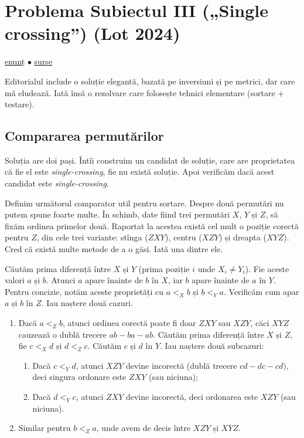 \documentclass[../main.tex]{subfiles}
\begin{document}
\section{Problema Subiectul III („Single crossing”) (Lot 2024)}
\label{problem:subiectul-iii}

\href{https://kilonova.ro/problems/2843}{enunț}
$\bullet$
\hyperref[code:subiectul-iii]{surse}

Editorialul include o soluție elegantă, bazată pe inversiuni și pe metrici, dar care mă eludează. Iată însă o rezolvare care folosește tehnici elementare (sortare + testare).

\subsection{Compararea permutărilor}

Soluția are doi pași. Întîi construim un candidat de soluție, care are proprietatea că fie el este \textit{single-crossing}, fie nu există soluție. Apoi verificăm dacă acest candidat este \textit{single-crossing}.

Definim următorul comparator util pentru sortare. Despre două permutări nu putem spune foarte multe. În schimb, date fiind trei permutări $X$, $Y$ și $Z$, să fixăm ordinea primelor două. Raportat la acestea există cel mult o poziție corectă pentru $Z$, din cele trei variante: stînga ($ZXY$), centru ($XZY$) și dreapta ($XYZ$). Cred că există multe metode de a o găsi. Iată una dintre ele.

Căutăm prima diferență între $X$ și $Y$ (prima poziție $i$ unde $X_i \neq Y_i$). Fie aceste valori $a$ și $b$. Atunci $a$ apare înainte de $b$ în $X$, iar $b$ apare înainte de $a$ în $Y$. Pentru concizie, notăm aceste proprietăți cu $a <_X b$ și $b <_Y a$. Verificăm cum apar $a$ și $b$ în $Z$. Iau naștere două cazuri.

\begin{enumerate}
  \item Dacă $a <_Z b$, atunci ordinea corectă poate fi doar $ZXY$ sau $XZY$, căci $XYZ$ cauzează o dublă trecere $ab-ba-ab$. Căutăm prima diferență între $X$ și $Z$, fie $c <_X d$ și $d <_Z c$. Căutăm $c$ și $d$ în $Y$. Iau naștere două subcazuri:

  \begin{enumerate}
    \item Dacă $c <_Y d$, atunci $XZY$ devine incorectă (dublă trecere $cd-dc-cd)$, deci singura ordonare este $ZXY$ (sau niciuna);
    \item Dacă $d <_Y c$, atunci $ZXY$ devine incorectă, deci ordonarea este $XZY$ (sau niciuna).
  \end{enumerate}

  \item Similar pentru $b <_Z a$, unde avem de decis între $XZY$ și $XYZ$.
\end{enumerate}
\end{document}
